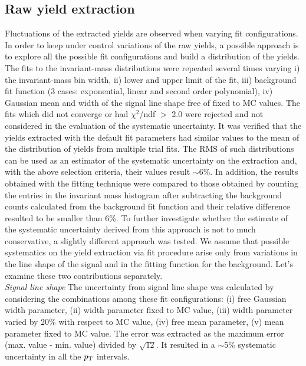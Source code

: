 \subsection{Raw yield extraction}
\label{sec:RawYieldSyst}
Fluctuations of the extracted yields are observed when varying fit 
configurations. 
In order to keep under control variations of the raw yields, a possible
approach is to explore all the possible fit configurations and build
a distribution of the yields. The fits to the invariant-mass 
distributions were repeated several times varying
i) the invariant-mass bin width, ii) lower and upper limit of the fit, 
iii) background fit function (3 cases: exponential, linear and second 
order polynomial), iv) Gaussian mean and width of the signal line shape 
free of fixed to MC
values. The fits which did not converge or had $\chi^2$/ndf $>$ 2.0 
were rejected and not considered in the evaluation of the 
systematic uncertainty. It was verified that the yields extracted with the
default fit parameters had similar values to the mean of
the distribution of yields from multiple trial fits. 
The RMS of such distributions can be used as an estimator of
the systematic uncertainty on the extraction and, with the above
selection criteria, their values result $\sim$6\%.
In addition, the results obtained with 
the fitting technique were compared to those obtained by 
counting the entries in the invariant mass histogram after 
subtracting the background counts calculated from the 
background fit function and their relative difference resulted
to be smaller than 6\%. 
To further investigate whether the estimate of the systematic uncertainty
derived from this approach is not to much conservative, a slightly
different approach was tested. We assume that 
possible systematics on the yield extraction via fit procedure 
arise only from variations in the line shape of the signal and 
in the fitting function for the 
background. Let's examine these two contributions separately.\\

\emph{Signal line shape}
The uncertainty from signal line shape was calculated by 
considering the combinations among these fit
configurations: (i) free Gaussian width parameter, (ii) width parameter 
fixed to MC value, (iii) width parameter varied by 20\% with 
respect to MC value,  (iv) free mean parameter, (v) mean parameter fixed to MC value.
The error was extracted as the maximum error (max. value - min. value) divided by $\sqrt{12}$.
It resulted in a $\sim$5\% systematic uncertainty in all the $p_{\rm T}$ intervals.

